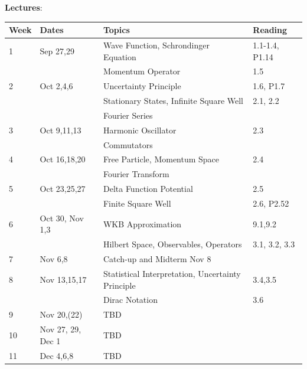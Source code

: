 \documentclass[12pt]{article}
\begin{document}
\noindent
\textbf {Lectures}:\\

\noindent
\begin{tabular}{llll}
\textbf{Week} & \textbf{Dates} & \textbf{Topics} & \textbf{Reading} \\
\hline
1  & Sep 27,29         & Wave Function, Schrondinger Equation & 1.1-1.4, P1.14 \\
   &                   & Momentum Operator  & 1.5 \\
\hline
2  & Oct 2,4,6         & Uncertainty Principle & 1.6, P1.7 \\
   &                   & Stationary States, Infinite Square Well & 2.1, 2.2 \\
   &                   & Fourier Series   & \\
\hline
3  & Oct 9,11,13       & Harmonic Oscillator & 2.3 \\
   &                   & Commutators         &   \\
\hline
4  & Oct 16,18,20      & Free Particle, Momentum Space & 2.4 \\
   &                   & Fourier Transform  &  \\
\hline
5  & Oct 23,25,27      & Delta Function Potential & 2.5 \\
   &                   & Finite Square Well & 2.6, P2.52\\
\hline
6  & Oct 30, Nov 1,3   & WKB Approximation & 9.1,9.2 \\
   &                   & Hilbert Space, Observables, Operators & 3.1, 3.2, 3.3\\
\hline
7  & Nov 6,8           & Catch-up and Midterm Nov 8 \\
\hline
8  & Nov 13,15,17      & Statistical Interpretation, Uncertainty Principle & 3.4,3.5 \\ 
   &                   & Dirac Notation & 3.6 \\
\hline
9  & Nov 20,(22)       & TBD \\
\hline
10  & Nov 27, 29, Dec 1 & TBD \\
\hline
11 & Dec 4,6,8         & TBD \\
\hline
\end{tabular}\\ \vskip 1cm
\end{document}

